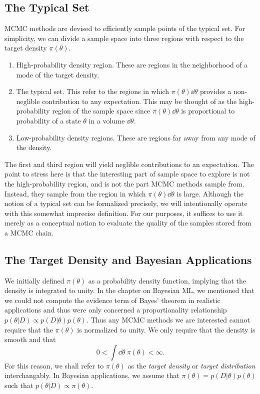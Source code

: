 \subsection{The Typical Set}
MCMC methods are devised to efficiently sample points of the typical set. For simplicity, we can divide a
sample space into three regions with respect to the target density $\pi(\theta)$.
\begin{enumerate}
    \item High-probability density region. These are regions in the neighborhood of a mode of the target density.
    \item The typical set. This refer to the regions in which $\pi(\theta) \dd \theta$ provides a non-neglible contribution
    to any expectation. This may be thought of as the high-probability region of the sample space
    since $\pi(\theta) \dd \theta$ is proportional to probability of a state $\theta$ in a volume $\dd \theta$. 
    \item Low-probability density regions. These are regions far away from any mode of the density.
\end{enumerate}
The first and third region will yield neglible contributions to an expectation.
The point to stress here is that the interesting part of sample space to explore is not the high-probability region, and is
not the part MCMC methods sample from. Instead, they sample from the region in which $\pi(\theta) \dd \theta$ is large.
Although the notion of a typical set can be formalized precisely, we will intentionally 
operate with this somewhat imprecise definition. For our purposes, it suffices to use it merely as
a conceptual notion to evaluate the quality of the samples stored from a MCMC chain. 
\subsection{The Target Density and Bayesian Applications}
We initially defined $\pi(\theta)$ as a probability density function, implying
that the density is integrated to unity. In the chapter on Bayesian ML, we mentioned that we could not compute the evidence term of Bayes' theorem in 
realistic applications and thus were only concerned a proportionality relationship $p(\theta|D)\propto p(D|\theta)p(\theta)$. Thus any MCMC methods we are interested cannot require that the $\pi(\theta)$ is normalized to unity. We only require that the density is smooth and that 
\begin{equation}
  0 < \int \dd\theta \ \pi(\theta) < \infty.
\end{equation} 
For this reason, we shall refer to $\pi(\theta)$ as the \textit{target density} or \textit{target distribution} interchangably.
In Bayesian applications, we assume that $\pi(\theta) = p(D|\theta)p(\theta)$ such that $p(\theta|D) \propto \pi(\theta)$.

